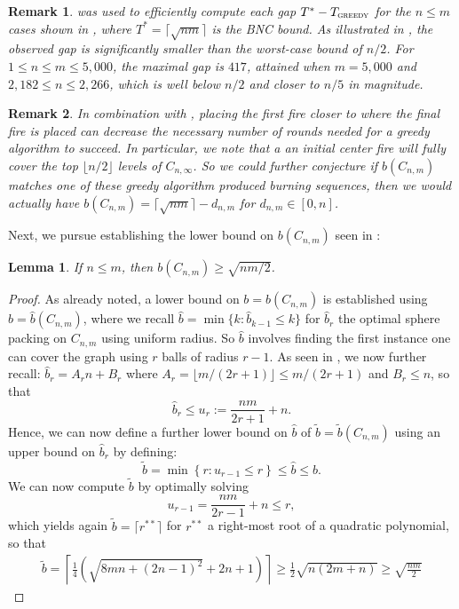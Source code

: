 \documentclass{article}
\def\floor#1{{\lfloor #1 \rfloor}}
\newcommand{\gr}{\textsc{greedy}}
\newtheorem{lemma}{Lemma}
\newtheorem{remark}{Remark}
\begin{document}
\begin{remark}
     was used to efficiently compute each gap $T^* - T_\gr$ for the $n \le m$ cases shown in , where $T^* = \lceil \sqrt{nm} \rceil$ is the BNC bound. As illustrated in , the observed gap is significantly smaller than the worst-case bound of $n/2$. For $1 \le n \le m \le 5{,}000$, the maximal gap is $417$, attained when $m=5{,}000$ and $2{,}182 \le n \le 2{,}266$, which is well below $n/2$ and closer to $n/5$ in magnitude.
\end{remark}

\begin{remark}
    In combination with , placing the first fire closer to where the final fire is placed can decrease the necessary number of rounds needed for a greedy algorithm to succeed. In particular, we note that a an initial center fire will fully cover the top $\floor{n/2}$ levels of $C_{n,\infty}$. So we could further conjecture if $b(C_{n,m})$ matches one of these greedy algorithm produced burning sequences, then we would actually have $b(C_{n,m}) = \lceil \sqrt{nm}\rceil - d_{n,m}$ for $d_{n,m} \in [0,n]$.
\end{remark}

Next, we pursue establishing the lower bound on $b(C_{n,m})$ seen in :

\begin{lemma}\label{l: tooth lower}
    If $n \le m$, then $b(C_{n,m}) \ge \sqrt{nm/2}$.
\end{lemma}

\begin{proof}
    As already noted, a lower bound on $b = b(C_{n,m})$ is established using $\hat b = \hat b(C_{n,m})$, where we recall $\hat b = \min \{k: \hat b_{k-1} \le k\}$ for $\hat b_r$ the optimal sphere packing on $C_{n,m}$ using uniform radius. So $\hat b$ involves finding the first instance one can cover the graph using $r$ balls of radius $r-1$. As seen in , we now further recall: $\hat b_r = A_r n + B_r$ where $A_r = \floor{m/(2r+1)} \le m/(2r+1)$ and $B_r \le n$, so that
    \[
    \hat b_r \le u_r := \frac{nm}{2r+1} + n.
    \]
    Hence, we can now define a further lower bound on $\hat b$ of $\tilde b = \tilde b(C_{n,m})$ using an upper bound on $\hat b_r$ by defining:
    \[
    \tilde b = \min\left\{ r :  u_{r-1} \le r\right\} \le \hat b \le b.
    \]
    We can now compute $\tilde b$ by optimally solving $$u_{r-1} = \frac{nm}{2r-1} + n \le r,$$
    which yields again $\tilde b = \lceil r^{**} \rceil $ for $r^{**}$ a right-most root of a quadratic polynomial, so that
    \begin{align*}
    \tilde b = \left\lceil \frac1 4 (\sqrt{8 m n + (2n-1)^2} + 2 n + 1)\right\rceil \ge \frac12 \sqrt{n(2m+n)} \ge \sqrt{\frac{nm}2}
    \end{align*}
\end{proof}
\end{document}
